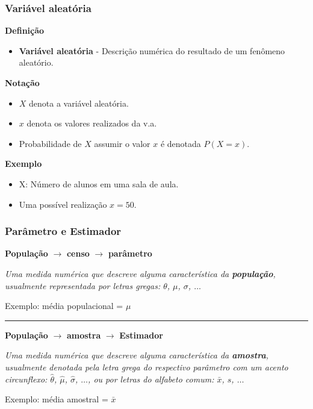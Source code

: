 \documentclass[11pt]{beamer}
\begin{document}
\begin{frame}
\frametitle{Variável aleatória}

\textbf{Definição}

\begin{itemize}
\item
  \textbf{Variável aleatória} - Descrição numérica do resultado de um
  fenômeno aleatório.
\end{itemize}

\textbf{Notação}

\begin{itemize}
\item
  \(X\) denota a variável aleatória.
\item
  \(x\) denota os valores realizados da v.a.
\item
  Probabilidade de \(X\) assumir o valor \(x\) é denotada \(P(X = x)\).
\end{itemize}

\textbf{Exemplo}

\begin{itemize}
\item
  X: Número de alunos em uma sala de aula.
\item
  Uma possível realização \(x = 50\).
\end{itemize}
\end{frame}

\begin{frame}
\frametitle{Parâmetro e Estimador}

\textbf{População} \(\rightarrow\) \textbf{censo} \(\rightarrow\)
\textbf{parâmetro}

\emph{Uma medida numérica que descreve alguma característica da
\textbf{população}, usualmente representada por letras gregas:
\(\theta\), \(\mu\), \(\sigma\), \(\ldots\)}

Exemplo: média populacional = \(\mu\)

\vspace{1em}
\hrule
\vspace{1em}

\textbf{População} \(\rightarrow\) \textbf{amostra} \(\rightarrow\)
\textbf{Estimador}

\emph{Uma medida numérica que descreve alguma característica da
\textbf{amostra}, usualmente denotada pela letra grega do respectivo
parâmetro com um acento circunflexo: \(\hat\theta\), \(\hat\mu\),
\(\hat\sigma\), \(\ldots\), ou por letras do alfabeto comum: \(\bar x\),
\(s\), \(\ldots\)}

Exemplo: média amostral = \(\bar{x}\)
\end{frame}
\end{document}
